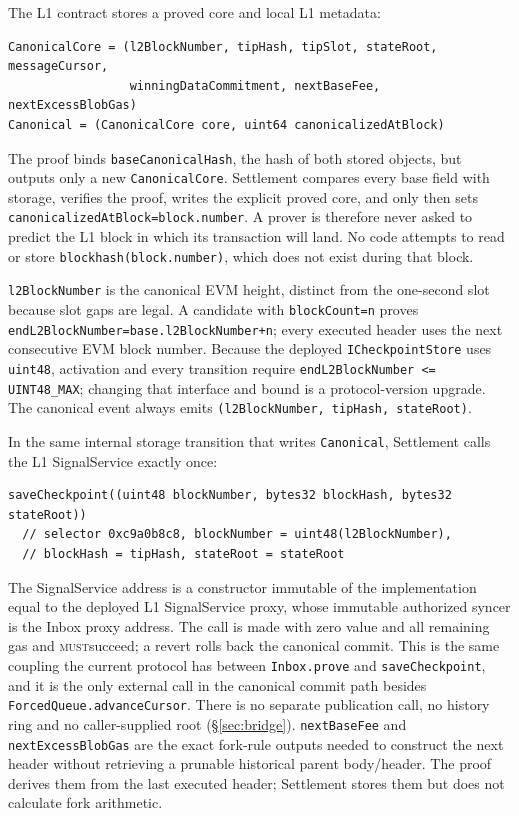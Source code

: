 \documentclass[a4paper,11pt]{article}
\newcommand{\code}[1]{\nolinkurl{#1}}
\newcommand{\must}{\textsc{must}}
\begin{document}
The L1 contract stores a proved core and local L1 metadata:

\begin{verbatim}
CanonicalCore = (l2BlockNumber, tipHash, tipSlot, stateRoot, messageCursor,
                 winningDataCommitment, nextBaseFee, nextExcessBlobGas)
Canonical = (CanonicalCore core, uint64 canonicalizedAtBlock)
\end{verbatim}

The proof binds \code{baseCanonicalHash}, the hash of both stored objects, but
outputs only a new \code{CanonicalCore}.  Settlement compares every base field
with storage, verifies the proof, writes the explicit proved core, and only then
sets \code{canonicalizedAtBlock=block.number}.  A prover is therefore never
asked to predict the L1 block in which its transaction will land.  No code
attempts to read or store \code{blockhash(block.number)}, which does not exist
during that block.

\code{l2BlockNumber} is the canonical EVM height, distinct from the one-second
slot because slot gaps are legal.  A candidate with \code{blockCount=n} proves
\code{endL2BlockNumber=base.l2BlockNumber+n}; every executed header uses the
next consecutive EVM block number.  Because the deployed \code{ICheckpointStore}
uses \code{uint48}, activation and every transition require
\code{endL2BlockNumber <= UINT48_MAX}; changing that interface and bound is a
protocol-version upgrade.  The canonical event always emits
\code{(l2BlockNumber, tipHash, stateRoot)}.

In the same internal storage transition that writes \code{Canonical},
Settlement calls the L1 SignalService exactly once:
\begin{verbatim}
saveCheckpoint((uint48 blockNumber, bytes32 blockHash, bytes32 stateRoot))
  // selector 0xc9a0b8c8, blockNumber = uint48(l2BlockNumber),
  // blockHash = tipHash, stateRoot = stateRoot
\end{verbatim}
The SignalService address is a constructor immutable of the implementation
equal to the deployed L1 SignalService proxy, whose immutable authorized syncer
is the Inbox proxy address.  The call is made with zero value and all
remaining gas and \must succeed; a revert rolls back the canonical commit.
This is the same coupling the current protocol has between \code{Inbox.prove}
and \code{saveCheckpoint}, and it is the only external call in the canonical
commit path besides \code{ForcedQueue.advanceCursor}.  There is no separate
publication call, no history ring and no caller-supplied root
(\S\ref{sec:bridge}).
\code{nextBaseFee} and \code{nextExcessBlobGas} are the exact fork-rule outputs
needed to construct the next header without retrieving a prunable historical
parent body/header.  The proof derives them from the last executed header;
Settlement stores them but does not calculate fork arithmetic.
\end{document}
